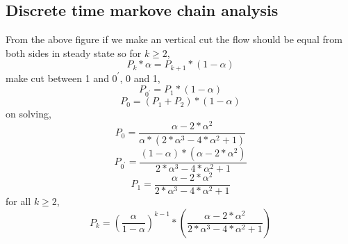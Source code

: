 \documentclass{article}
\begin{document}
\subsection{Discrete time markove chain analysis}
\begin{center}
\end{center}
From the above figure if we make an vertical cut the flow should be equal from both sides in steady state so for $k \geq 2$,
$$P_{k}*\alpha = P_{k+1}*(1-\alpha)$$
make cut between 1 and $0^{'}$, 0 and 1,
$$P_{0^{'}} = P_{1}*(1-\alpha)$$
$$P_{0} = (P_{1}+ P_{2})*(1-\alpha)$$
on solving,
$$P_{0} = \frac{\alpha - 2*\alpha^{2}}{\alpha*(2*\alpha^{3} - 4*\alpha^{2} + 1)}$$
$$P_{0^{'}} = \frac{(1-\alpha)*(\alpha - 2*\alpha^{2})}{2*\alpha^{3} - 4*\alpha^{2} + 1}$$
$$P_{1} = \frac{\alpha - 2*\alpha^{2}}{2*\alpha^{3} - 4*\alpha^{2} + 1}$$
for all $k \geq 2$,
$$P_{k} = (\frac{\alpha}{1-\alpha})^{k-1}*(\frac{\alpha - 2*\alpha^{2}}{2*\alpha^{3} - 4*\alpha^{2} + 1})$$
\end{document}
